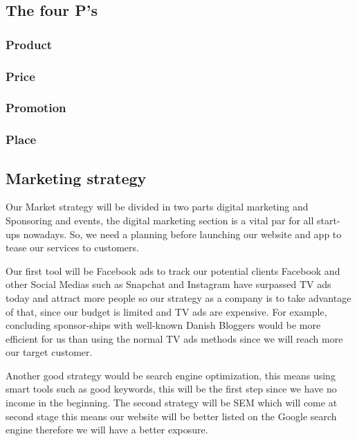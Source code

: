 \documentclass[12p]{article}
\begin{document}
\subsection{The four P's} \label{PPPP}

\subsubsection{Product}
\subsubsection{Price}

\subsubsection{Promotion}
\subsubsection{Place}

\newpage


\subsection{Marketing strategy} \label{MarketingStrategy}
Our Market strategy will be divided in two parts digital marketing and Sponsoring and events, the digital marketing section is a vital par for all start-ups nowadays.
So, we need a planning before launching our website and app to tease our services to customers.

Our first tool will be Facebook ads to track our potential clients Facebook and other Social Medias such as Snapchat and Instagram have surpassed TV ads today and attract more people so our strategy as a company is to take advantage of that, since our budget is limited and TV ads are expensive. 
For example, concluding sponsor-ships with well-known Danish Bloggers would be more efficient for us than using the normal TV ads methods since we will reach more our target customer.

Another good strategy would be search engine optimization, this means using smart tools such as good keywords, this will be the first step since we have no income in the beginning.
The second strategy will be SEM which will come at second stage this means our website will be better listed on the Google search engine therefore we will have a better exposure.
\end{document}
